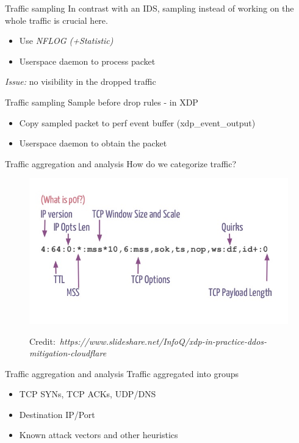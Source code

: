 \documentclass{beamer}
\newcommand{\credit}[1]{\par\hfill \tiny Credit:~\itshape#1}
\begin{document}
\begin{frame}{Traffic sampling}
  In contrast with an IDS, sampling instead of working on the whole traffic is crucial here.
  \begin{itemize}
    \item Use \textit{NFLOG (+Statistic)}
    \item Userspace daemon to process packet
  \end{itemize}
  \pause
    \textit{Issue:} no visibility in the dropped traffic
\end{frame}

\begin{frame}{Traffic sampling}
  Sample before drop rules - in XDP
  \begin{itemize}
    \item Copy sampled packet to perf event buffer (xdp\_event\_output)
    \item Userspace daemon to obtain the packet
  \end{itemize}
\end{frame}

\begin{frame}{Traffic aggregation and analysis}
  How do we categorize traffic?
  \pause
  \begin{figure}
    \includegraphics[width=\linewidth]{./p0f.jpg}
    \credit{https://www.slideshare.net/InfoQ/xdp-in-practice-ddos-mitigation-cloudflare}
  \end{figure}
\end{frame}

\begin{frame}{Traffic aggregation and analysis}
  Traffic aggregated into groups
  \begin{itemize}
    \item TCP SYNs, TCP ACKs, UDP/DNS
    \item Destination IP/Port
    \item Known attack vectors and other heuristics
  \end{itemize}
\end{frame}
\end{document}
